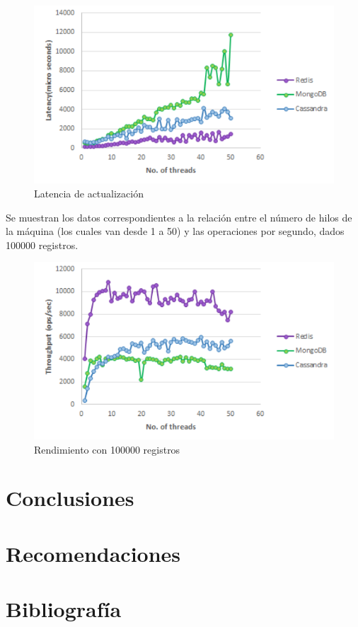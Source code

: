 \documentclass[twocolumn]{article}
\begin{document}
\begin{figure}[H]
  \includegraphics[width = \columnwidth]{img/07_g5.png}
  \caption{Latencia de actualización}
\end{figure}

Se muestran los datos correspondientes a la relación entre el número de hilos de la máquina (los cuales van desde 1 a 50) y las operaciones por segundo, dados 100000 registros.

\begin{figure}[H]
  \includegraphics[width = \columnwidth]{img/08_g6.png}
  \caption{Rendimiento con 100000 registros}
\end{figure}

\section{Conclusiones}



\section{Recomendaciones}



\section{Bibliografía}
\end{document}
